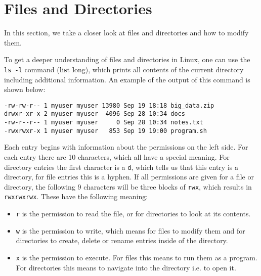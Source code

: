 \section{Files and Directories}
\label{sec:file_and_dirs}

In this section, we take a closer look at files and directories and how to modify them.

To get a deeper understanding of files and directories in Linux, one can use the \lstinline{ls -l} command (\textbf{l}i\textbf{s}t \textbf{l}ong), which prints all contents of the current directory including additional information. An example of the output of this command is shown below:

\begin{lstlisting}
-rw-rw-r-- 1 myuser myuser 13980 Sep 19 18:18 big_data.zip
drwxr-xr-x 2 myuser myuser  4096 Sep 28 10:34 docs
-rw-r--r-- 1 myuser myuser     0 Sep 28 10:34 notes.txt
-rwxrwxr-x 1 myuser myuser   853 Sep 19 19:00 program.sh
\end{lstlisting}

Each entry begins with information about the permissions on the left side. For each entry there are 10 characters, which all have a special meaning. For directory entries the first character is a \lstinline{d}, which tells us that this entry is a directory, for file entries this is a hyphen. If all permissions are given for a file or directory, the following 9 characters will be three blocks of \lstinline{rwx}, which results in \lstinline{rwxrwxrwx}. These have the following meaning:

\begin{itemize}
    \item \lstinline{r} is the permission to read the file, or for directories to look at its contents.
    \item \lstinline{w} is the permission to write, which means for files to modify them and for directories to create, delete or rename entries inside of the directory.
    \item \lstinline{x} is the permission to execute. For files this means to run them as a program. For directories this means to navigate into the directory i.e. to open it.
\end{itemize}

